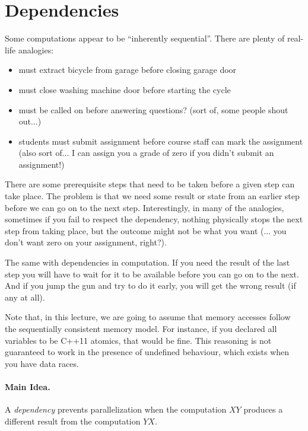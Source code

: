 




\section*{Dependencies}
Some computations appear to be ``inherently sequential''. There are plenty of real-life analogies:

\begin{itemize}
\item must extract bicycle from garage before closing garage door
 
\item must close washing machine door before starting the cycle
 
\item must be called on before answering questions? (sort of, some people shout out...)
 
\item students must submit assignment before course staff can mark the assignment (also sort of... I can assign you a grade of zero if you didn't submit an assignment!)
\end{itemize}

There are some prerequisite steps that need to be taken before a given step can take place. The problem is that we need some result or state from an earlier step before we can go on to the next step. Interestingly, in many of the analogies, sometimes if you fail to respect the dependency, nothing physically stops the next step from taking place, but the outcome might not be what you want (... you don't want zero on your assignment, right?).

The same with dependencies in computation. If you need the result of the last step you will have to wait for it to be available before you can go on to the next. And if you jump the gun and try to do it early, you will get the wrong result (if any at all).

Note that, in this lecture, we are going to assume that memory accesses follow the
sequentially consistent memory model. For instance, if you declared all variables
to be C++11 atomics, that would be fine. This reasoning is not guaranteed to work
in the presence of undefined behaviour, which exists when you have data races.

\paragraph{Main Idea.} A \emph{dependency} prevents parallelization
when the computation $XY$ produces a different result from the
computation $YX$.

